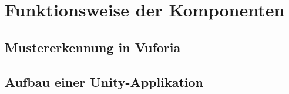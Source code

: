 \chapter{Funktionsweise der Komponenten}\label{ch:funktionsweise_der_komponenten}
\section{Mustererkennung in Vuforia}
\section{Aufbau einer Unity-Applikation}